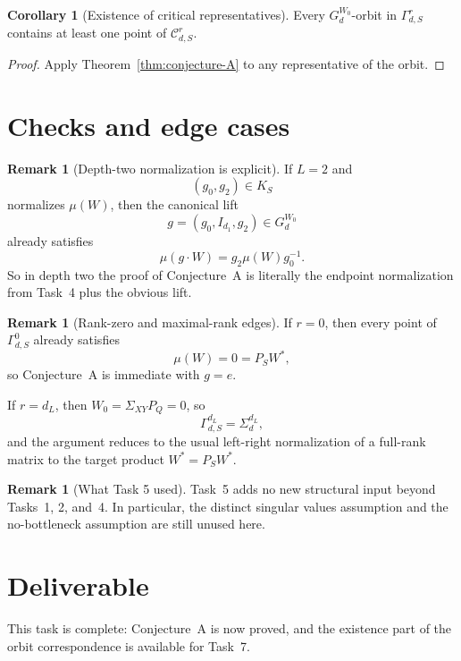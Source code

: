 \documentclass{article}
\theoremstyle{definition}
\newtheorem{corollary}[theorem]{Corollary}
\newtheorem{remark}[theorem]{Remark}
\begin{document}
\begin{corollary}[Existence of critical representatives]\label{cor:existence-critical-representatives}
Every $G_d^{W_0}$-orbit in $\Gamma_{d,S}^r$ contains at least one point of
$\mathcal C_{d,S}^r$.
\end{corollary}

\begin{proof}
Apply Theorem~\ref{thm:conjecture-A} to any representative of the orbit.
\end{proof}

\section{Checks and edge cases}

\begin{remark}[Depth-two normalization is explicit]
If $L=2$ and
\[
(g_0,g_2)\in K_S
\]
normalizes $\mu(W)$, then the canonical lift
\[
g=(g_0,I_{d_1},g_2)\in G_d^{W_0}
\]
already satisfies
\[
\mu(g\cdot W)=g_2\mu(W)g_0^{-1}.
\]
So in depth two the proof of Conjecture~A is literally the endpoint
normalization from Task~4 plus the obvious lift.
\end{remark}

\begin{remark}[Rank-zero and maximal-rank edges]
If $r=0$, then every point of $\Gamma_{d,S}^0$ already satisfies
\[
\mu(W)=0=P_SW^\ast,
\]
so Conjecture~A is immediate with $g=e$.

If $r=d_L$, then $W_0=\Sigma_{XY}P_Q=0$, so
\[
\Gamma_{d,S}^{d_L}=\Sigma_d^{d_L},
\]
and the argument reduces to the usual left-right normalization of a full-rank
matrix to the target product $W^\ast=P_SW^\ast$.
\end{remark}

\begin{remark}[What Task 5 used]
Task~5 adds no new structural input beyond Tasks~1, 2, and~4. In particular,
the distinct singular values assumption and the no-bottleneck assumption are
still unused here.
\end{remark}

\section{Deliverable}

This task is complete: Conjecture~A is now proved, and the existence part of the
orbit correspondence is available for Task~7.
\end{document}

